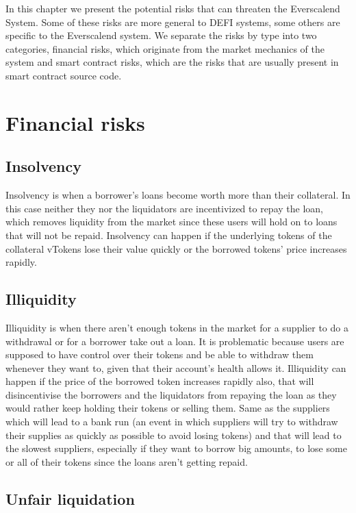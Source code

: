 
In this chapter we present the potential risks that can threaten the Everscalend System. Some of these risks are more general to DEFI systems, some others are specific to the Everscalend system. We separate the risks by type into two categories, financial risks, which originate from the market mechanics of the system and smart contract risks, which are the risks that are usually present in smart contract source code.

\section{Financial risks}

\subsection{Insolvency}

Insolvency is when a borrower's loans become worth more than their collateral. In this case neither they nor the liquidators are incentivized to repay the loan, which removes liquidity from the market since these users will hold on to loans that will not be repaid. Insolvency can happen if the underlying tokens of the collateral vTokens lose their value quickly or the borrowed tokens' price increases rapidly.

\subsection{Illiquidity}

Illiquidity is when there aren't enough tokens in the market for a supplier to do a withdrawal or for a borrower take out a loan. It is problematic because users are supposed to have control over their tokens and be able to withdraw them whenever they want to, given that their account's health allows it. Illiquidity can happen if the price of the borrowed token increases rapidly also, that will disincentivise the borrowers and the liquidators from repaying the loan as they would rather keep holding their tokens or selling them. Same as the suppliers which will lead to a bank run (an event in which suppliers will try to withdraw their supplies as quickly as possible to avoid losing tokens) and that will lead to the slowest suppliers, especially if they want to borrow big amounts, to lose some or all of their tokens since the loans aren't getting repaid.

\subsection{Unfair liquidation}

